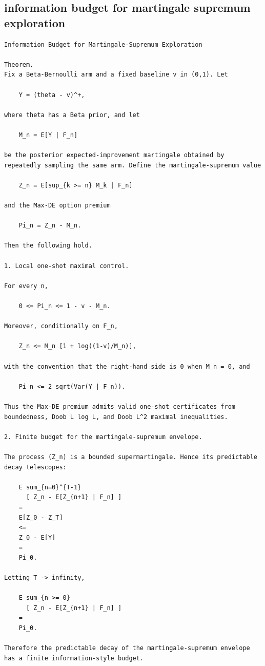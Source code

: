 \subsection{information budget for martingale supremum exploration}
\begin{small}
\begin{verbatim}
Information Budget for Martingale-Supremum Exploration

Theorem.
Fix a Beta-Bernoulli arm and a fixed baseline v in (0,1). Let

    Y = (theta - v)^+,

where theta has a Beta prior, and let

    M_n = E[Y | F_n]

be the posterior expected-improvement martingale obtained by repeatedly sampling the same arm. Define the martingale-supremum value

    Z_n = E[sup_{k >= n} M_k | F_n]

and the Max-DE option premium

    Pi_n = Z_n - M_n.

Then the following hold.

1. Local one-shot maximal control.

For every n,

    0 <= Pi_n <= 1 - v - M_n.

Moreover, conditionally on F_n,

    Z_n <= M_n [1 + log((1-v)/M_n)],

with the convention that the right-hand side is 0 when M_n = 0, and

    Pi_n <= 2 sqrt(Var(Y | F_n)).

Thus the Max-DE premium admits valid one-shot certificates from boundedness, Doob L log L, and Doob L^2 maximal inequalities.

2. Finite budget for the martingale-supremum envelope.

The process (Z_n) is a bounded supermartingale. Hence its predictable decay telescopes:

    E sum_{n=0}^{T-1}
      [ Z_n - E[Z_{n+1} | F_n] ]
    =
    E[Z_0 - Z_T]
    <=
    Z_0 - E[Y]
    =
    Pi_0.

Letting T -> infinity,

    E sum_{n >= 0}
      [ Z_n - E[Z_{n+1} | F_n] ]
    =
    Pi_0.

Therefore the predictable decay of the martingale-supremum envelope has a finite information-style budget.


\end{verbatim}
\end{small}
